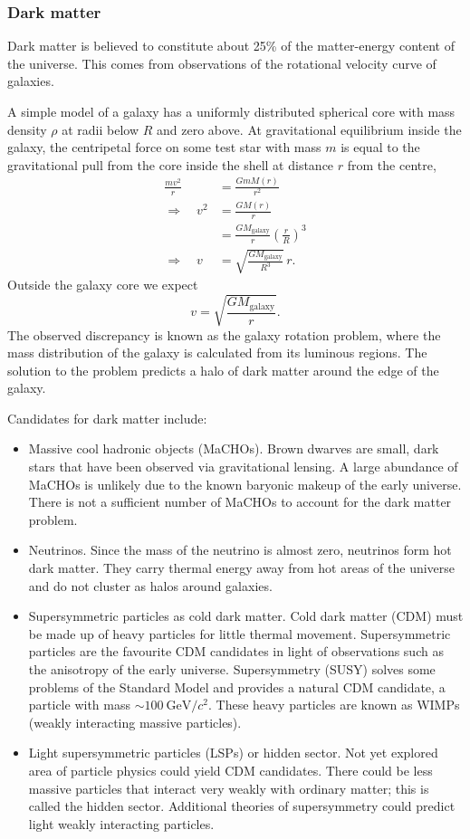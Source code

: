 \documentclass{report}
\begin{document}
\subsubsection{Dark matter}
Dark matter is believed to constitute about 25\% of the matter-energy content of the universe. This comes from observations of the rotational velocity curve of galaxies.

A simple model of a galaxy has a uniformly distributed spherical core with mass density $\rho$ at radii below $R$ and zero above. At gravitational equilibrium inside the galaxy, the centripetal force on some test star with mass $m$ is equal to the gravitational pull from the core inside the shell at distance $r$ from the centre,
\begin{align}
\frac{mv^2}{r} &= \frac{GmM(r)}{r^2} \\
\Rightarrow \quad v^2 &= \frac{GM(r)}{r} \\
&= \frac{GM_\text{galaxy}}{r}\left(\frac{r}{R}\right)^3\\
\Rightarrow \quad v &= \sqrt{\frac{GM_\text{galaxy}}{R^3}} \, r.
\end{align}
Outside the galaxy core we expect
\begin{equation}
v = \sqrt{\frac{GM_\text{galaxy}}{r}}.
\end{equation}
The observed discrepancy is known as the galaxy rotation problem, where the mass distribution of the galaxy is calculated from its luminous regions. The solution to the problem predicts a halo of dark matter around the edge of the galaxy.

Candidates for dark matter include:
\begin{itemize}
\item Massive cool hadronic objects (MaCHOs). Brown dwarves are small, dark stars that have been observed via gravitational lensing. A large abundance of MaCHOs is unlikely due to the known baryonic makeup of the early universe. There is not a sufficient number of MaCHOs to account for the dark matter problem.
\item Neutrinos. Since the mass of the neutrino is almost zero, neutrinos form hot dark matter. They carry thermal energy away from hot areas of the universe and do not cluster as halos around galaxies.
\item Supersymmetric particles as cold dark matter. Cold dark matter (CDM) must be made up of heavy particles for little thermal movement. Supersymmetric particles are the favourite CDM candidates in light of observations such as the anisotropy of the early universe. Supersymmetry (SUSY) solves some problems of the Standard Model and provides a natural CDM candidate, a particle with mass $\sim \SI{100}{\giga\electronvolt/c^2}$. These heavy particles are known as WIMPs (weakly interacting massive particles).
\item Light supersymmetric particles (LSPs) or hidden sector. Not yet explored area of particle physics could yield CDM candidates. There could be less massive particles that interact very weakly with ordinary matter; this is called the hidden sector. Additional theories of supersymmetry could predict light weakly interacting particles.
\end{itemize}
\end{document}
